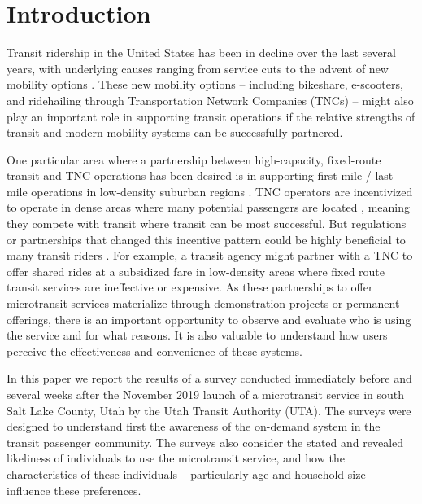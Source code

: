 \documentclass[smartcities,article,submit,moreauthors,pdftex]{mdpi}
\begin{document}

\hypertarget{intro}{%
\section{Introduction}\label{intro}}

Transit ridership in the United States has been in decline over the last several
years, with underlying causes ranging from service cuts to the advent of new
mobility options \citep{Graehler2019, Mallett2018}. These new mobility options --
including bikeshare, e-scooters, and ridehailing through Transportation Network
Companies (TNCs) -- might also play an important role in supporting transit
operations if the relative strengths of transit and modern mobility systems can
be successfully partnered.

One particular area where a partnership between high-capacity, fixed-route
transit and TNC operations has been desired is in supporting first mile / last
mile operations in low-density suburban regions \citep{Shaheen2016, alonso2018, Kang2020}. TNC operators are incentivized to operate in dense areas where many
potential passengers are located \citep{Wong2020}, meaning they compete with transit
where transit can be most successful. But regulations or partnerships that
changed this incentive pattern could be highly beneficial to many transit riders
\citep{Ronald2017, Deakin2010}. For example, a transit agency might partner with a
TNC to offer shared rides at a subsidized fare in low-density areas where fixed
route transit services are ineffective or expensive. As these partnerships to
offer microtransit services materialize through demonstration projects or
permanent offerings, there is an important opportunity to observe and evaluate
who is using the service and for what reasons. It is also valuable to understand
how users perceive the effectiveness and convenience of these systems.

In this paper we report the results of a survey conducted immediately before and
several weeks after the November 2019 launch of a microtransit service in south
Salt Lake County, Utah by the Utah Transit Authority (UTA). The surveys were
designed to understand first the awareness of the on-demand system in the
transit passenger community. The surveys also consider the stated and revealed
likeliness of individuals to use the microtransit service, and how the
characteristics of these individuals -- particularly age and household size --
influence these preferences.
\end{document}

